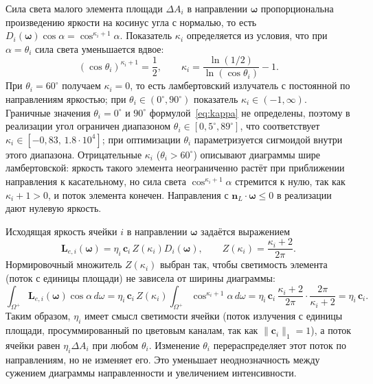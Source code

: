 Сила света малого элемента площади $\Delta A_i$ в направлении $\boldsymbol{\omega}$ пропорциональна произведению яркости на косинус угла с нормалью, то есть $D_i(\boldsymbol{\omega})\cos\alpha=\cos^{\kappa_i+1}\alpha$. Показатель $\kappa_i$ определяется из условия, что при $\alpha=\theta_i$ сила света уменьшается вдвое:
\begin{equation}
\left(\cos\theta_i\right)^{\kappa_i+1}=\frac{1}{2},
\qquad
\kappa_i
=
\frac{\ln(1/2)}{\ln(\cos\theta_i)}-1.
\label{eq:kappa}
\end{equation}
При $\theta_i=60^\circ$ получаем $\kappa_i=0$, то есть ламбертовский излучатель с постоянной по направлениям яркостью; при $\theta_i\in(0^\circ,90^\circ)$ показатель $\kappa_i\in(-1,\infty)$. Граничные значения $\theta_i=0^\circ$ и $90^\circ$ формулой~\eqref{eq:kappa} не определены, поэтому в реализации угол ограничен диапазоном $\theta_i\in[0,5^\circ,89^\circ]$, что соответствует $\kappa_i\in[-0,83,\,1.8\cdot10^4]$; при оптимизации $\theta_i$ параметризуется сигмоидой внутри этого диапазона. Отрицательные $\kappa_i$ ($\theta_i>60^\circ$) описывают диаграммы шире ламбертовской: яркость такого элемента неограниченно растёт при приближении направления к касательному, но сила света $\cos^{\kappa_i+1}\alpha$ стремится к нулю, так как $\kappa_i+1>0$, и поток элемента конечен. Направления с $\mathbf{n}_L\cdot\boldsymbol{\omega}\le0$ в реализации дают нулевую яркость.

Исходящая яркость ячейки $i$ в направлении $\boldsymbol{\omega}$ задаётся выражением
\begin{equation}
\mathbf{L}_{e,i}(\boldsymbol{\omega})
=
\eta_i\,
\mathbf{c}_i\,
Z(\kappa_i)
D_i(\boldsymbol{\omega}),
\qquad
Z(\kappa_i)
=
\frac{\kappa_i+2}{2\pi}.
\label{eq:tex5-radiance}
\end{equation}
Нормировочный множитель $Z(\kappa_i)$ выбран так, чтобы светимость элемента (поток с единицы площади) не зависела от ширины диаграммы:
\begin{equation}
\int_{\Omega^+}
\mathbf{L}_{e,i}(\boldsymbol{\omega})\cos\alpha\,d\omega
=
\eta_i\,\mathbf{c}_i\,
Z(\kappa_i)
\int_{\Omega^+}
\cos^{\kappa_i+1}\alpha\,d\omega
=
\eta_i\,\mathbf{c}_i\,
\frac{\kappa_i+2}{2\pi}\cdot\frac{2\pi}{\kappa_i+2}
=
\eta_i\,\mathbf{c}_i.
\label{eq:tex5-exitance}
\end{equation}
Таким образом, $\eta_i$ имеет смысл светимости ячейки (поток излучения с единицы площади, просуммированный по цветовым каналам, так как $\|\mathbf{c}_i\|_1=1$), а поток ячейки равен $\eta_i\Delta A_i$ при любом $\theta_i$. Изменение $\theta_i$ перераспределяет этот поток по направлениям, но не изменяет его. Это уменьшает неоднозначность между сужением диаграммы направленности и увеличением интенсивности.

